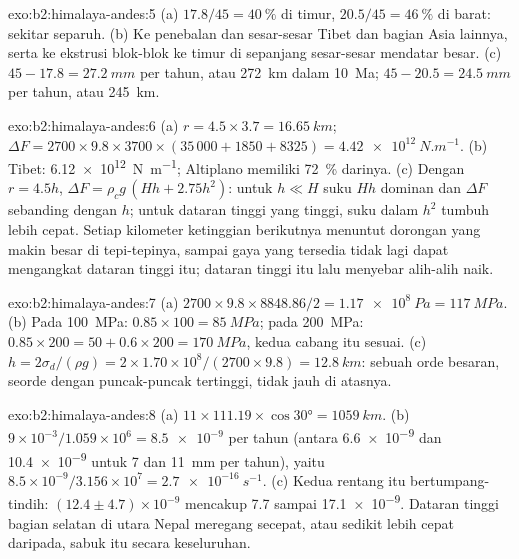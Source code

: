 \begin{solution}{exo:b2:himalaya-andes:5}
(a) $17.8/45 = \qty{40}{\percent}$ di timur, $20.5/45 = \qty{46}{\percent}$ di barat:
sekitar separuh. (b) Ke penebalan dan sesar-sesar Tibet dan bagian Asia lainnya, serta ke
ekstrusi blok-blok ke timur di sepanjang sesar-sesar mendatar besar. (c) $45 - 17.8 =
\qty{27.2}{mm}$ per tahun, atau \qty{272}{km} dalam \qty{10}{Ma}; $45 - 20.5 = \qty{24.5}{mm}$ per
tahun, atau \qty{245}{km}.
\end{solution}

\begin{solution}{exo:b2:himalaya-andes:6}
(a) $r = 4.5\times3.7 = \qty{16.65}{km}$; $\Delta F = 2700\times9.8\times3700\times(35\,000 +
1850 + 8325) = \qty{4.42e12}{N.m^{-1}}$. (b) Tibet: \qty{6.12e12}{N.m^{-1}}; Altiplano
memiliki \qty{72}{\percent} darinya. (c) Dengan $r = 4.5h$, $\Delta F = \rho_c g\,(Hh + 2.75h^2)$: untuk
$h \ll H$ suku $Hh$ dominan dan $\Delta F$ sebanding dengan $h$; untuk dataran tinggi yang tinggi,
suku dalam $h^2$ tumbuh lebih cepat. Setiap kilometer ketinggian berikutnya menuntut dorongan yang makin besar di
tepi-tepinya, sampai gaya yang tersedia tidak lagi dapat mengangkat dataran tinggi itu; dataran tinggi itu lalu menyebar
alih-alih naik.
\end{solution}

\begin{solution}{exo:b2:himalaya-andes:7}
(a) $2700\times9.8\times8848.86/2 = \qty{1.17e8}{Pa} = \qty{117}{MPa}$. (b) Pada
\qty{100}{MPa}: $0.85\times100 = \qty{85}{MPa}$; pada \qty{200}{MPa}: $0.85\times200 = 50 +
0.6\times200 = \qty{170}{MPa}$, kedua cabang itu sesuai. (c) $h = 2\sigma_d/(\rho g) =
2\times1.70\times10^8/(2700\times9.8) = \qty{12.8}{km}$: sebuah orde besaran, seorde dengan
puncak-puncak tertinggi, tidak jauh di atasnya.
\end{solution}

\begin{solution}{exo:b2:himalaya-andes:8}
(a) $11\times111.19\times\cos\ang{30} = \qty{1059}{km}$. (b) $9\times10^{-3}/1.059\times10^{6}
= \num{8.5e-9}$ per tahun (antara \num{6.6e-9} dan \num{10.4e-9} untuk 7 dan \qty{11}{mm} per tahun),
yaitu $8.5\times10^{-9}/3.156\times10^{7} = \qty{2.7e-16}{s^{-1}}$. (c) Kedua rentang itu
bertumpang-tindih: $(12.4 \pm 4.7) \times 10^{-9}$ mencakup 7.7 sampai \num{17.1e-9}. Dataran tinggi bagian selatan di utara
Nepal meregang secepat, atau sedikit lebih cepat daripada, sabuk itu secara keseluruhan.
\end{solution}

